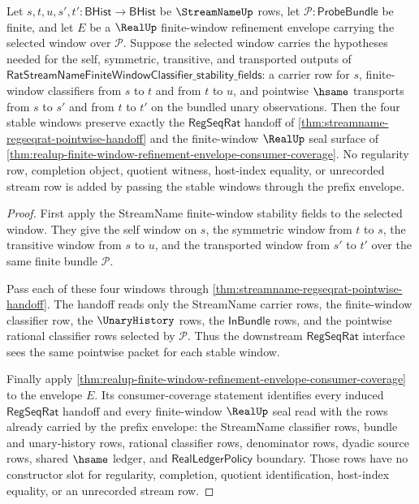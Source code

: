 \begin{theorem}
\label{thm:streamname-regseqrat-window-stability-real-prefix-handoff}
Let $s,t,u,s',t':\mathsf{BHist}\to\mathsf{BHist}$ be
$\StreamNameUp$ rows, let $\mathcal{P}:\mathsf{ProbeBundle}$ be finite, and
let $E$ be a $\RealUp$ finite-window refinement envelope carrying the selected
window over $\mathcal{P}$. Suppose the selected window carries the hypotheses
needed for the self, symmetric, transitive, and transported outputs of
$\mathsf{RatStreamNameFiniteWindowClassifier\_stability\_fields}$: a carrier
row for $s$, finite-window classifiers from $s$ to $t$ and from $t$ to $u$,
and pointwise $\hsame$ transports from $s$ to $s'$ and from $t$ to $t'$ on
the bundled unary observations. Then the four stable windows preserve exactly
the $\mathsf{RegSeqRat}$ handoff of
\autoref{thm:streamname-regseqrat-pointwise-handoff} and the finite-window
$\RealUp$ seal surface of
\autoref{thm:realup-finite-window-refinement-envelope-consumer-coverage}.
No regularity row, completion object, quotient witness, host-index equality,
or unrecorded stream row is added by passing the stable windows through the
prefix envelope.
\end{theorem}
\begin{proof}
First apply the StreamName finite-window stability fields to the selected
window. They give the self window on $s$, the symmetric window from $t$ to
$s$, the transitive window from $s$ to $u$, and the transported window from
$s'$ to $t'$ over the same finite bundle $\mathcal{P}$.

Pass each of these four windows through
\autoref{thm:streamname-regseqrat-pointwise-handoff}. The handoff reads only
the StreamName carrier rows, the finite-window classifier row, the
$\UnaryHistory$ rows, the $\mathsf{InBundle}$ rows, and the pointwise rational
classifier rows selected by $\mathcal{P}$. Thus the downstream
$\mathsf{RegSeqRat}$ interface sees the same pointwise packet for each stable
window.

Finally apply
\autoref{thm:realup-finite-window-refinement-envelope-consumer-coverage} to
the envelope $E$. Its consumer-coverage statement identifies every induced
$\mathsf{RegSeqRat}$ handoff and every finite-window $\RealUp$ seal read with
the rows already carried by the prefix envelope: the StreamName classifier
rows, bundle and unary-history rows, rational classifier rows, denominator
rows, dyadic source rows, shared $\hsame$ ledger, and
$\mathsf{RealLedgerPolicy}$ boundary. Those rows have no constructor slot for
regularity, completion, quotient identification, host-index equality, or an
unrecorded stream row.
\end{proof}

